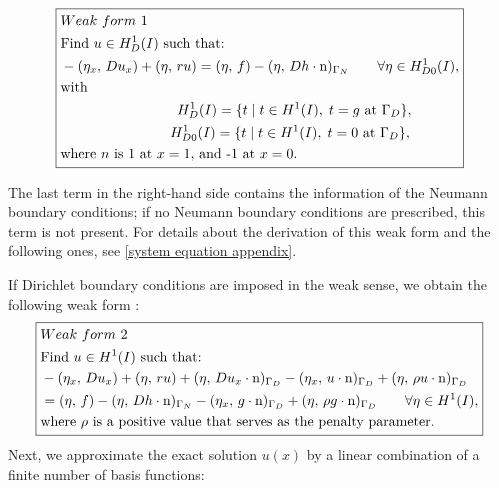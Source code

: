 \documentclass[final,3p]{elsarticle}
\begin{document}
\begin{equation}
\centering
\boxed{ 
\begin{aligned}
&Weak ~form~ 1 ~~~~~~~~~\\
&\text{Find $u \in H _D^1 (I)$ such that:} \\
&-({ \eta} _{ x }, \,D { u} _{ x }  ) + (\eta, \, ru) = (\eta, \, f ) - (\eta, \, D h \cdot \text{n} )_{\Gamma _N} \qquad \forall \eta \in H _{D0}^1 (I),\\
&\text{with} \\
&~~~~~~~~~~~~~~~~~~~~~~~~~H_{D} ^1 (I) = \{t \; | \; t \in H^1 (I), \; t = g \text{ at } \Gamma _D \},  \\
&~~~~~~~~~~~~~~~~~~~~~~~\,H_{D0} ^1 (I) = \{t \; | \; t \in H^1 (I), \; t = 0 \text{ at } \Gamma _D\},\\
&\text{where } {n} \text{ is 1 at $x=1$, and -1 at $x=0$.}
\end{aligned}	\label{1D_general_SM_weak_form} 
}
\end{equation}

 
The last term in the right-hand side contains the information of the Neumann boundary conditions; if no Neumann boundary conditions are prescribed, this term is not present.
For details about the derivation of this weak form and the following ones, see \ref{system equation appendix}.

If Dirichlet boundary conditions are imposed in the weak sense, we obtain the following weak form \citep{bazilevs2007weak}:
\begin{equation}
\centering
\boxed{
\begin{aligned}
&Weak ~form~ 2 ~~~~~~~~~\\
&\text{Find } u \in H ^1 (I) \text{ such that:}\\
& - ( { \eta} _{ x }, \, D { u} _{ x } ) + (\eta, \, ru) + (\eta, \, D u_x \cdot \text{n} )_{\Gamma _D} - (\eta _x, \, u \cdot \text{n} )_{\Gamma _D} + (\eta, \, \rho u \cdot \text{n} )_{\Gamma _D} \\ 
&= (\eta, \, f ) - (\eta, \, D h \cdot \text{n} )_{\Gamma _N} - (\eta _x, \, g \cdot \text{n} )_{\Gamma _D} + (\eta, \, \rho g \cdot \text{n} )_{\Gamma _D} \qquad \forall \eta \in H ^1 (I), \\
&\text{where } \rho \text{ is a } \text{{positive}} \text{ value that serves as the penalty parameter}.
\end{aligned}	\label{1D_general_SM_weak_form_weak_Diri}
}
\end{equation}
Next, we approximate the exact solution $u(x)$ by a linear combination of a finite number of basis functions:
\end{document}
